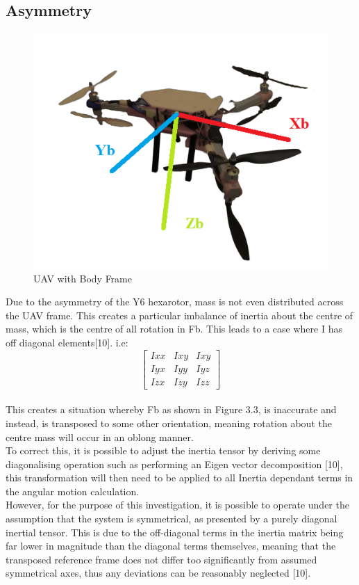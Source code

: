 \documentclass[12pt,a4paper,twoside]{report}
\begin{document}
				\subsection{Asymmetry}
					
					\begin{figure}[h!]
						\centering
						\includegraphics[width=0.6\linewidth]{UAVBodyFrame.png}
						\caption{UAV with Body Frame}
						\label{fig:uavbodyframe}
					\end{figure}
						
					Due to the asymmetry of the Y6 hexarotor, mass is not even distributed across the UAV frame. This creates a particular imbalance of inertia about the centre of mass, which is the centre of all rotation in Fb. This leads to a case where I has off diagonal elements[10]. i.e:
					\\
					$$ 
					\begin{bmatrix}
						Ixx & Ixy & Ixy \\
						Iyx & Iyy & Iyz \\
						Izx & Izy & Izz
					\end{bmatrix}
					$$
					\\
					This creates a situation whereby Fb as shown in Figure 3.3, is inaccurate and instead, is transposed to some other orientation, meaning rotation about the centre mass will occur in an oblong manner.
					\\
					To correct this, it is possible to adjust the inertia tensor by deriving some diagonalising operation such as performing an Eigen vector decomposition [10], this transformation will then need to be applied to all Inertia dependant terms in the angular motion calculation.
					\\  
					However, for the purpose of this investigation, it is possible to operate under the assumption that the system is symmetrical, as presented by a purely diagonal inertial tensor. This is due to the off-diagonal terms in the inertia matrix being far lower in magnitude than the diagonal terms themselves, meaning that the transposed reference frame does not differ too significantly from assumed symmetrical axes, thus any deviations can be reasonably neglected [10].
			
\end{document}
